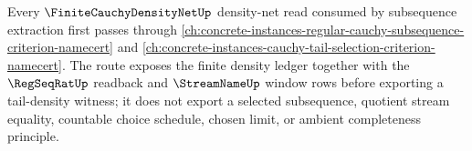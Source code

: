 Every $\FiniteCauchyDensityNetUp$ density-net read consumed by subsequence extraction first passes through \autoref{ch:concrete-instances-regular-cauchy-subsequence-criterion-namecert} and \autoref{ch:concrete-instances-cauchy-tail-selection-criterion-namecert}. The route exposes the finite density ledger together with the $\RegSeqRatUp$ readback and $\StreamNameUp$ window rows before exporting a tail-density witness; it does not export a selected subsequence, quotient stream equality, countable choice schedule, chosen limit, or ambient completeness principle.
